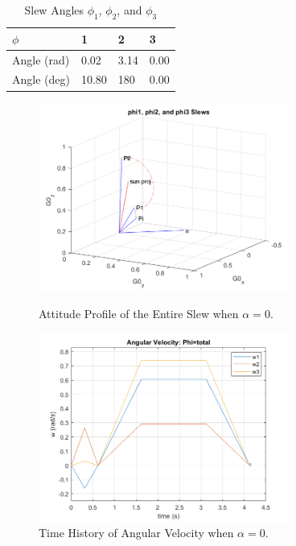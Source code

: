 \documentclass[letterpaper, preprint, paper,11pt]{AAS}	%
\begin{document}
			
			
			\begin{table}[H]
				\centering
				\caption{Slew Angles $\phi_1$, $\phi_2$, and $\phi_3$}
				\begin{tabular}{llll}
					\toprule
					\midrule
					$\phi$ & 1 & 2 & 3 \\
					\midrule
					Angle (rad) & 0.02 & 3.14 & 0.00 \\
					Angle (deg) & 10.80 & 180 & 0.00 \\ 
					\midrule
					\bottomrule
				\end{tabular}%
				\label{tab:FOG_SF}%
			\end{table}%
			
			\begin{figure}[H]
			\begin{center}
				\label{fig:phi1_phi2_phi3_alpha0}
				\includegraphics[width=3.25in]{figures/alpha0/phi1_phi2_phi3.png}
				\caption{Attitude Profile of the Entire Slew when $\alpha=0$.}
			\end{center}
			\end{figure}
			
			
			\begin{figure}[H]
				\label{fig:ang_vel_phi_total_alpha0}
				\begin{center}
					\includegraphics[width=3.25in]{figures/alpha0/ang_vel.png}
				\end{center}
				\caption{Time History of Angular Velocity when $\alpha=0$.}
			\end{figure}
			
\end{document}
